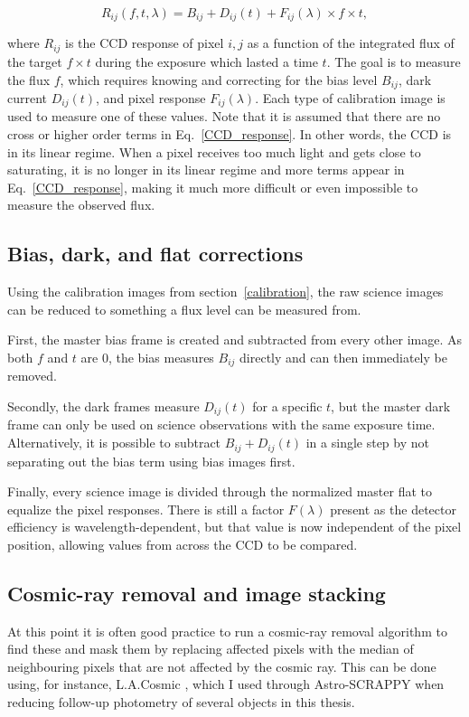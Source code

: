 \documentclass[a4paper,oneside,12pt, class=Latex/Classes/PhDthesisPSnPDF, crop=false]{standalone}
\begin{document}
\begin{equation}
	R_{ij}(f, t, \lambda) = B_{ij} + D_{ij}(t) + F_{ij}(\lambda) \times f \times t,
	\label{CCD_response}
\end{equation}

where $R_{ij}$ is the CCD response of pixel $i,j$ as a function of the integrated flux of the target $f \times t$ during the exposure which lasted a time $t$. The goal is to measure the flux $f$, which requires knowing and correcting for the bias level $B_{ij}$, dark current $D_{ij}(t)$, and pixel response $F_{ij}(\lambda)$. Each type of calibration image is used to measure one of these values. Note that it is assumed that there are no cross or higher order terms in Eq.~\ref{CCD_response}. In other words, the CCD is in its linear regime. When a pixel receives too much light and gets close to saturating, it is no longer in its linear regime and more terms appear in Eq.~\ref{CCD_response}, making it much more difficult or even impossible to measure the observed flux.


\subsection{Bias, dark, and flat corrections}
Using the calibration images from section~\ref{calibration}, the raw science images can be reduced to something a flux level can be measured from. 

First, the master bias frame is created and subtracted from every other image. As both $f$ and $t$ are 0, the bias measures $B_{ij}$ directly and can then immediately be removed.

Secondly, the dark frames measure $D_{ij}(t)$ for a specific $t$, but the master dark frame can only be used on science observations with the same exposure time. Alternatively, it is possible to subtract $B_{ij} + D_{ij}(t)$ in a single step by not separating out the bias term using bias images first.

Finally, every science image is divided through the normalized master flat to equalize the pixel responses. There is still a factor $F(\lambda)$ present as the detector efficiency is wavelength-dependent, but that value is now independent of the pixel position, allowing values from across the CCD to be compared.

\subsection{Cosmic-ray removal and image stacking}
At this point it is often good practice to run a cosmic-ray removal algorithm to find these and mask them by replacing affected pixels with the median of neighbouring pixels that are not affected by the cosmic ray. This can be done using, for instance, L.A.Cosmic \citep{lacosmic}, which I used through Astro-SCRAPPY \citep{astroSCRAPPY} when reducing follow-up photometry of several objects in this thesis.
\end{document}
